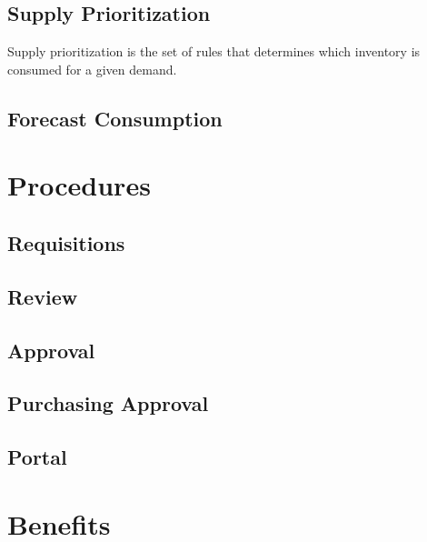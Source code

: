 \documentclass[letterpaper,10pt,english]{sphinxmanual}
\begin{document}
\section{Supply Prioritization}
\label{\detokenize{BusinessProcessReengineering:id3}}
Supply prioritization is the set of rules that determines which
inventory is consumed for a given demand.


\section{Forecast Consumption}
\label{\detokenize{BusinessProcessReengineering:forecast-consumption}}

\chapter{Procedures}
\label{\detokenize{BusinessProcessReengineering:procedures}}

\section{Requisitions}
\label{\detokenize{BusinessProcessReengineering:requisitions}}

\section{Review}
\label{\detokenize{BusinessProcessReengineering:review}}

\section{Approval}
\label{\detokenize{BusinessProcessReengineering:approval}}

\section{Purchasing Approval}
\label{\detokenize{BusinessProcessReengineering:purchasing-approval}}

\section{Portal}
\label{\detokenize{BusinessProcessReengineering:portal}}

\chapter{Benefits}
\label{\detokenize{BusinessProcessReengineering:benefits}}
\end{document}
